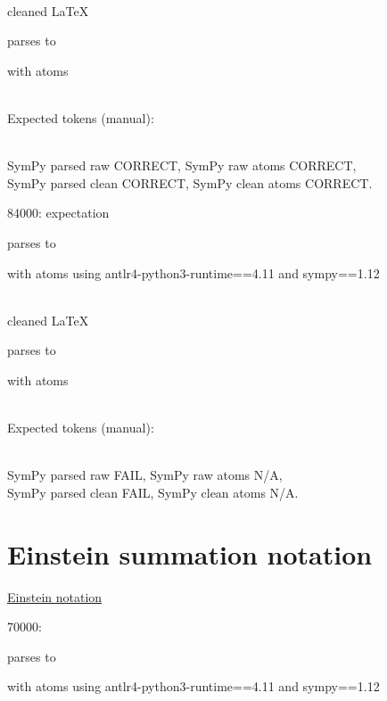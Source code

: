 \documentclass{article}
\begin{document}
\ \\
cleaned \LaTeX

parses to

with atoms


\ \\
Expected tokens (manual):


\ \\
SymPy parsed raw CORRECT, 
SymPy raw atoms CORRECT, \\
SymPy parsed clean CORRECT, 
SymPy clean atoms CORRECT.

\hrulefill

84000:
expectation

parses to

with atoms
using antlr4-python3-runtime==4.11 and sympy==1.12

\ \\
cleaned \LaTeX

parses to

with atoms


\ \\
Expected tokens (manual):


\ \\
SymPy parsed raw FAIL, 
SymPy raw atoms N/A, \\
SymPy parsed clean FAIL, 
SymPy clean atoms N/A.

\hrulefill


\section{Einstein summation notation}


\href{https://en.wikipedia.org/wiki/Einstein_notation}{Einstein notation}

70000:

parses to

with atoms
using antlr4-python3-runtime==4.11 and sympy==1.12
\end{document}
